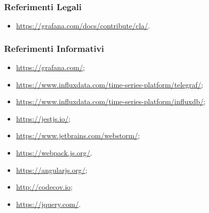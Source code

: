 \subsubsection{Referimenti Legali}
\begin{itemize}
	\item \url{https://grafana.com/docs/contribute/cla/}.
\end{itemize}

\subsubsection{Referimenti Informativi}
\begin{itemize}
	\item \url{https://grafana.com/};
	\item \url{https://www.influxdata.com/time-series-platform/telegraf/};
	\item \url{https://www.influxdata.com/time-series-platform/influxdb/};
	\item \url{https://jestjs.io/};
	\item \url{https://www.jetbrains.com/webstorm/};
	\item \url{https://webpack.js.org/}.
	\item \url{https://angularjs.org/};
	\item \url{http://codecov.io};
	\item \url{https://jquery.com/}.
\end{itemize}